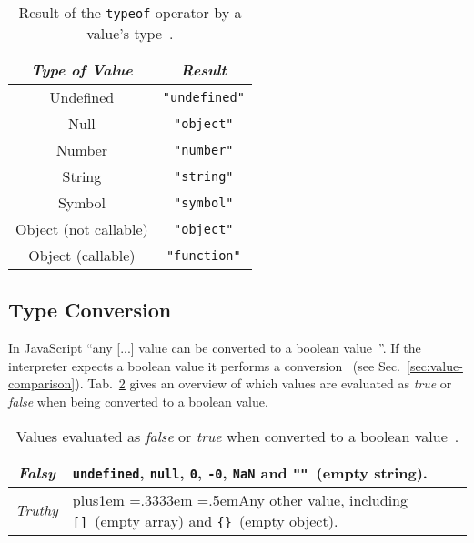 \begin{table}[h]
\caption{Result of the \texttt{typeof} operator by a value's type~\cite[p.~164]{ES6Spec:Ecma:2015}.}
\label{tab:typeof}
\centering
  \setlength{\tabcolsep}{5mm}
  \def\arraystretch{1.25}
  \small
  \begin{tabular}{|c|c|}
    \hline
    \emph{Type of Value} & \emph{Result} \\
    \hline \hline
    Undefined & \texttt{"undefined"} \\
    \hline
    Null & \texttt{"object"} \\
    \hline
    Number & \texttt{"number"} \\
    \hline
    String & \texttt{"string"} \\
    \hline
    Symbol & \texttt{"symbol"} \\
    \hline
    Object (not callable) & \texttt{"object"} \\
    \hline
    Object (callable) & \texttt{"function"} \\
    \hline
  \end{tabular}
\end{table}

\subsection{Type Conversion}
\label{sec:type-conversion}

In JavaScript ``any [...] value can be converted to a boolean value~\cite[p.~40]{JavaScriptTheDefinitiveGuide:Flanagan:2011}''. If the interpreter expects a boolean value it performs a conversion~\cite[p.~46]{JavaScriptTheDefinitiveGuide:Flanagan:2011} (see Sec.~\ref{sec:value-comparison}). Tab.~\ref{tab:truthy-falsy} gives an overview of which values are evaluated as \emph{true} or \emph{false} when being converted to a boolean value.

\begin{table}[h]
\caption{Values evaluated as \emph{false} or \emph{true} when converted to a boolean value~\cite[p.~40]{JavaScriptTheDefinitiveGuide:Flanagan:2011}.}\label{tab:truthy-falsy}
\centering
  \def\rr{\rightskip=0pt plus1em \spaceskip=.3333em \xspaceskip=.5em\relax}
  \setlength{\tabcolsep}{1ex}
  \def\arraystretch{1.20}
  \setlength{\tabcolsep}{1ex}
  \small
  \begin{tabular}{|c||l|}
    \hline
    \emph{Falsy} & \texttt{undefined}, \texttt{null}, \texttt{0}, \texttt{-0}, \texttt{NaN} and \texttt{""}~(empty string). \\
    \hline
    \emph{Truthy} & {\rr Any other value, including \texttt{[]}~(empty array) and \texttt{\{\}}~(empty object). } \\
    \hline
  \end{tabular}
\end{table}

